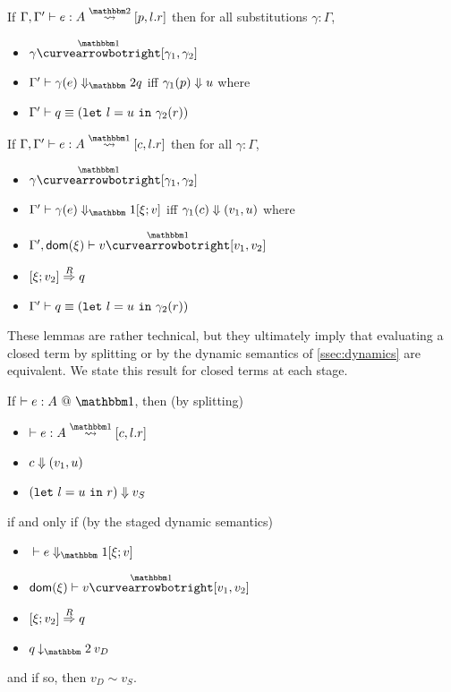 \begin{lemma}
If $\Gamma, \Gamma'\vdash e : A \splittwosym [p,l.r]$ then for all substitutions $\gamma : \Gamma$,
\begin{itemize}
\item $\gamma \vsplito [\gamma_1, \gamma_2]$
\item $\diatwo [\Gamma'] {\gamma(e)} q$ iff ${\gamma_1(p)} \Downarrow {u}$ where
\item $\Gamma' \vdash q \equiv ({\tt let}~{l} = {u}~{\tt in}~{\gamma_2(r)})$
\end{itemize}
\end{lemma}

\begin{lemma}
If $\Gamma, \Gamma'\vdash e : A \splitonesym [c,l.r]$ then for all $\gamma : \Gamma$,
\begin{itemize}
\item $\gamma \vsplito [\gamma_1, \gamma_2]$
\item $\diaone [\Gamma'] {\gamma(e)} {\xi;v}$ iff ${\gamma_1(c)} \Downarrow {(v_1,u)}$ where
\item $\Gamma',\dom \xi \vdash v \vsplito [v_1,v_2]$
\item $[{\xi};{v_2}]\overset{R}\Rightarrow{q}$
\item $\Gamma'\vdash q \equiv ({\tt let}~{l} = {u}~{\tt in}~{\gamma_2(r)})$
\end{itemize}
\end{lemma}

These lemmas are rather technical, but they ultimately imply that evaluating a
closed term by splitting or by the dynamic semantics of \ref{ssec:dynamics} are
equivalent. 
We state this result for closed terms at each stage.

\begin{theorem}
If $\vdash e:A~@~\bbone$, then (by splitting)
\begin{itemize}
\item $\vdash e : A \splitonesym [c,l.r]$
\item ${c} \Downarrow {(v_1,u)}$
\item ${({\tt let}~{l} = {u}~{\tt in}~{r})} \Downarrow {v}_S$
\end{itemize}
if and only if (by the staged dynamic semantics)
\begin{itemize}
\item $\diaone [] e {\xi;v}$
\item $\dom \xi \vdash v \vsplito [v_1,v_2]$
\item $[{\xi};{v_2}]\overset{R}\Rightarrow{q}$
\item $q \mathbin{\tworedsym} v_D$
\end{itemize}
and if so, then $v_D \sim v_S$.
\end{theorem}

